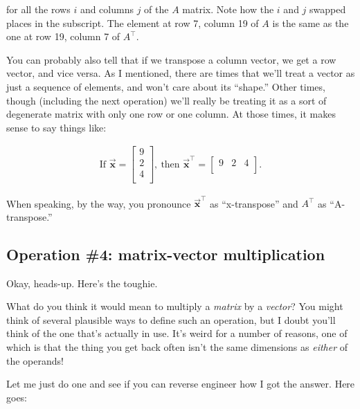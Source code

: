 for all the rows $i$ and columns $j$ of the $A$ matrix. Note how the $i$ and
$j$ swapped places in the subscript. The element at row 7, column 19 of $A$ is
the same as the one at row 19, column 7 of $A^\intercal$.

\smallskip

\label{rowAndColVectors}

You can probably also tell that if we transpose a column vector, we get a row
vector, and vice versa. As I mentioned, there are times that we'll treat a
vector as just a sequence of elements, and won't care about its ``shape.''
Other times, though (including the next operation) we'll really be treating it
as a sort of degenerate matrix with only one row or one column. At those times,
it makes sense to say things like:

\vspace{-.15in}
\begin{align*}
\textrm{If } \overrightarrow{\textbf{x}} = 
\begin{bmatrix}
9 \\
2 \\
4 \\
\end{bmatrix},
\ \textrm{then } \overrightarrow{\textbf{x}}^\intercal = 
\begin{bmatrix}
9 & 2 & 4 \\
\end{bmatrix}.
\end{align*}

When speaking, by the way, you pronounce
$\overrightarrow{\textbf{x}}^\intercal$ as ``x-transpose'' and $A^\intercal$ as
``A-transpose.''

\subsection{Operation \#4: matrix-vector multiplication}

\label{matrixVectorMultiplication}

Okay, heads-up. Here's the toughie.

What do you think it would mean to multiply a \textit{matrix} by a
\textit{vector}? You might think of several plausible ways to define such an
operation, but I doubt you'll think of the one that's actually in use. It's
weird for a number of reasons, one of which is that the thing you get back
often isn't the same dimensions as \textit{either} of the operands!

Let me just do one and see if you can reverse engineer how I got the answer.
Here goes:

